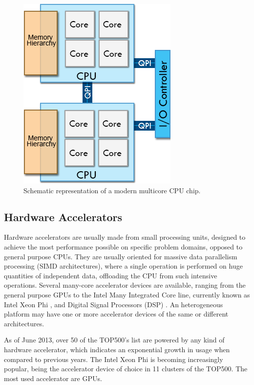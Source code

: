\begin{figure}[!htp]
	\begin{center}
		\includegraphics[scale=0.5]{../../common/img/numa_qpi.png}
		\caption{Schematic representation of a modern multicore CPU chip.}
		\label{fig:CPUChip}
	\end{center}
\end{figure}

\subsection*{Hardware Accelerators}
\label{HardwareAccelerators}

Hardware accelerators are usually made from small processing units, designed to achieve the most performance possible on specific problem domains, opposed to general purpose CPUs. They are usually oriented for massive data parallelism processing (SIMD architectures), where a single operation is performed on huge quantities of independent data, offloading the CPU from such intensive operations. Several many-core accelerator devices are available, ranging from the general purpose GPUs to the Intel Many Integrated Core line, currently known as Intel Xeon Phi \cite{Intel:MIC}, and Digital Signal Processors (DSP) \cite{Texas:DSP}. An heterogeneous platform may have one or more accelerator devices of the same or different architectures.

As of June 2013, over 50 of the TOP500’s list \cite{TOP500} are powered by any kind of hardware accelerator, which indicates an exponential growth in usage when compared to previous years. The Intel Xeon Phi is becoming increasingly popular, being the accelerator device of choice in 11 clusters of the TOP500. The most used accelerator are \nvidia GPUs.


